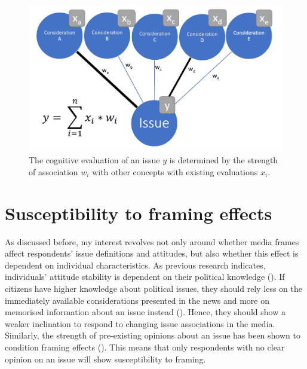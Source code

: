 \documentclass{article}
\begin{document}
\begin{center}
\begin{figure}
    \centering
    \includegraphics[width=\textwidth]{pres/vis/CognitiveStorage.png}
    \caption{The cognitive evaluation of an issue $y$ is determined by the strength of association $w_i$ with other concepts with existing evaluations $x_i$.}
    \label{fig:cogStor}
\end{figure}
\end{center}



\section{Susceptibility to framing effects}

As discussed before, my interest revolves not only around whether media frames affect respondents' issue definitions and attitudes, but also whether this effect is dependent on individual characteristics. As previous research indicates, individuals' attitude stability is dependent on their political knowledge (\cite{Converse1962}). If citizens have higher knowledge about political issues, they should rely less on the immediately available considerations presented in the news and more on memorised information about an issue instead (\cite{Zaller1992}). Hence, they should show a weaker inclination to respond to changing issue associations in the media. Similarly, the strength of pre-existing opinions about an issue has been shown to condition framing effects (\cite{Bechtel2015, Chong2013}). This means that only respondents with no clear opinion on an issue will show susceptibility to framing. 
\end{document}
